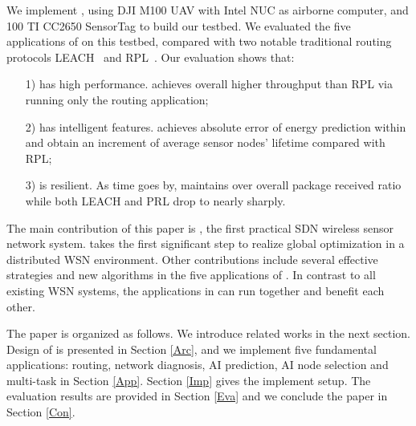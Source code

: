 We implement {\sdn}, using DJI M100 UAV with Intel NUC as airborne computer, 
and 100 TI CC2650 SensorTag to build our testbed.
We evaluated the five applications of  {\sdn} on this testbed, 
compared with two notable traditional routing protocols LEACH~\cite{kaur2016wsn} and RPL~\cite{winter2012rpl}.
Our evaluation shows that:
\begin{itemize}
	\item[1)] {\sdn} has high performance. {\sdn} achieves overall {\simpleTput} higher
		throughput than RPL via running only the routing application;
	\item[2)] {\sdn} has intelligent features. {\sdn} achieves absolute error of energy prediction within {\Error} 
		and obtain an {\totalLife} increment of average sensor nodes' lifetime compared with RPL;
	\item[3)] {\sdn} is resilient. As time goes by, {\sdn} maintains over
		{\pktRecvRatio} overall package received ratio while both LEACH and PRL drop to nearly {\OpktRecvRatio}
		sharply.
\end{itemize}

The main contribution of this paper is {\sdn}, the first 
practical SDN wireless sensor network system. 
{\sdn} takes the first significant step to realize global optimization in a distributed WSN environment.
Other contributions include several effective strategies and new algorithms 
in the five applications of {\sdn}. 
In contrast to all existing WSN systems, the applications in {\sdn}
can run together and benefit each other. 



The paper is organized as follows. We introduce related works in the next section. 
Design of {\sdn} is presented in Section \ref{Arc}, 
and we implement five fundamental applications: routing, network diagnosis, 
AI prediction, AI node selection and multi-task in Section \ref{App}. 
Section \ref{Imp} gives the implement setup.
The evaluation results are provided in Section \ref{Eva} 
and we conclude the paper in Section \ref{Con}.
